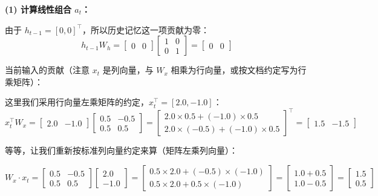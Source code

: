 \documentclass[a4paper,11pt]{ctexart}
\begin{document}
\begin{solutionbox}[参考答案与详细解析]
    \textbf{(1) 计算线性组合 $a_t$：}

    由于 $h_{t-1} = [0, 0]^\top$，所以历史记忆这一项贡献为零：
    \[
    h_{t-1} W_h = \begin{bmatrix} 0 & 0 \end{bmatrix}
    \begin{bmatrix} 1 & 0 \\ 0 & 1 \end{bmatrix}
    = \begin{bmatrix} 0 & 0 \end{bmatrix}
    \]

    当前输入的贡献（注意 $x_t$ 是列向量，与 $W_x$ 相乘为行向量，或按文档约定写为行乘矩阵）：

    这里我们采用行向量左乘矩阵的约定，$x_t^\top = [2.0, -1.0]$：
    \[
    x_t^\top W_x =
    \begin{bmatrix} 2.0 & -1.0 \end{bmatrix}
    \begin{bmatrix} 0.5 & -0.5 \\ 0.5 & 0.5 \end{bmatrix}
    =
    \begin{bmatrix}
        2.0 \times 0.5 + (-1.0) \times 0.5 \\
        2.0 \times (-0.5) + (-1.0) \times 0.5
    \end{bmatrix}^\top
    =
    \begin{bmatrix} 1.5 & -1.5 \end{bmatrix}
    \]

    等等，让我们重新按标准列向量约定来算（矩阵左乘列向量）：

    \[
    W_x \cdot x_t =
    \begin{bmatrix} 0.5 & -0.5 \\ 0.5 & 0.5 \end{bmatrix}
    \begin{bmatrix} 2.0 \\ -1.0 \end{bmatrix}
    =
    \begin{bmatrix}
        0.5 \times 2.0 + (-0.5) \times (-1.0) \\
        0.5 \times 2.0 + 0.5 \times (-1.0)
    \end{bmatrix}
    =
    \begin{bmatrix} 1.0 + 0.5 \\ 1.0 - 0.5 \end{bmatrix}
    =
    \begin{bmatrix} 1.5 \\ 0.5 \end{bmatrix}
    \]


\end{solutionbox}
\end{document}
